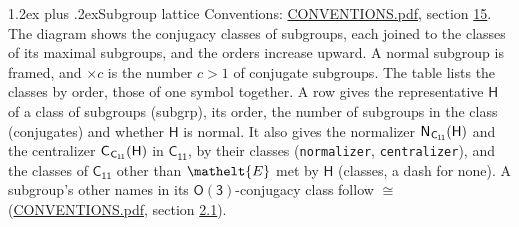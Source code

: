\documentclass[10pt,a4paper]{article}
\makeatletter
\renewcommand\section{\@startsection{section}{1}{\z@}{-3ex plus -1ex minus -.2ex}%
  {1.2ex plus .2ex}{\normalfont\large\sffamily\bfseries\color{parttitle}}}
\numberwithin{equation}{section}
\newcommand{\eltfont}[1]{{\let\sigma\eltsigma\mathelt{#1}}}
\newcommand{\grp}[1]{\mathsf{#1}}
\newcommand{\cls}[1]{\eltfont{#1}}
\newcommand{\samecls}{\cong}
\newcommand{\hairsp}{\mkern1mu}
\makeatother
\begin{document}
\section{Subgroup lattice}\label{s:subgroups}
Conventions: \href{../../CONVENTIONS.pdf}{CONVENTIONS.pdf}, section \href{../../CONVENTIONS.pdf\#conv.15}{15}.
The diagram shows the conjugacy classes of subgroups, each joined to the classes of its maximal subgroups, and the orders increase upward. \label{n:index.conjugates.c}A normal subgroup is framed, and ${\times}c$ is the number $c > 1$ of conjugate subgroups. The table lists the classes by order, those of one symbol together. \label{n:group.H}\label{n:head.subgroup}\label{n:head.order}\label{n:head.conjugates}\label{n:head.normal}A row gives the representative $\grp{H}$ of a class of subgroups (subgrp), its order, the number of subgroups in the class (conjugates) and whether $\grp{H}$ is normal. \label{n:group.normalizer}\label{n:group.centralizer}\label{n:head.classes}It also gives the normalizer $\grp{N}_{\hairsp \grp{C_{11}}}(\grp{H})$ and the centralizer $\grp{C}_{\hairsp \grp{C_{11}}}(\grp{H})$ in $\grp{C_{11}}$, by their classes (\texttt{normalizer}, \texttt{centralizer}), and the classes of $\grp{C_{11}}$ other than $\cls{E}$ met by $\grp{H}$ (classes, a dash for none). A subgroup's other names in its \href{O3.pdf}{$\grp{O(3)}$}-conjugacy class follow $\samecls$ (\href{../../CONVENTIONS.pdf}{CONVENTIONS.pdf}, section \href{../../CONVENTIONS.pdf\#conv.2.1}{2.1}).
\begin{center}
\end{center}
\end{document}
